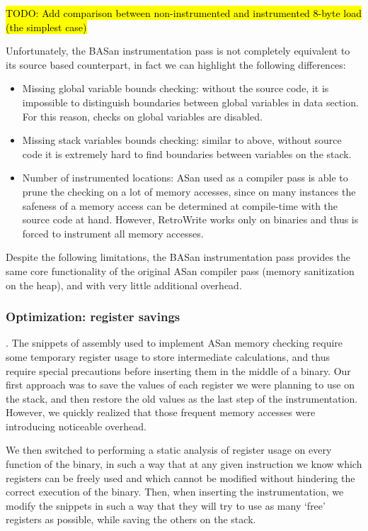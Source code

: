 \documentclass[a4paper,11pt,oneside]{report}
\newcommand{\sysname}{RetroWrite\xspace}
\DeclareRobustCommand{\todo}[1]{{\sethlcolor{cyan}\hl{TODO: #1}}}
\begin{document}
\todo{Add comparison between non-instrumented and instrumented 8-byte load (the 
simplest case)}

Unfortunately, the BASan instrumentation pass is not completely equivalent to 
its source based counterpart, in fact we can highlight the following 
differences:
\begin{itemize}
	\item Missing global variable bounds checking: without the source code, it 
		is impossible to distinguish boundaries between global variables in 
		data section. For this reason, checks on global variables are disabled.
	\item Missing stack variables bounds checking: similar to above, without 
		source code it is extremely hard to find boundaries between variables 
		on the stack.
	\item Number of instrumented locations: ASan used as a compiler pass is 
		able to prune the checking on a lot of memory accesses, since on many 
		instances the safeness of a memory access can be determined at 
		compile-time with the source code at hand. However, \sysname works only 
		on binaries and thus is forced to instrument all memory accesses.
\end{itemize}
Despite the following limitations, the BASan instrumentation pass provides the 
same core functionality of the original ASan compiler pass (memory sanitization 
on the heap), and with very little additional overhead.

\subsubsection{Optimization: register savings}.
The snippets of assembly used to implement ASan memory checking require some 
temporary register usage to store intermediate calculations, and thus require 
special precautions before inserting them in the middle of a binary. Our first 
approach was to save the values of each register we were planning to use on the 
stack, and then restore the old values as the last step of the instrumentation.  
However, we quickly realized that those frequent memory accesses were 
introducing noticeable overhead. 

We then switched to performing a static analysis of register usage on every 
function of the binary, in such a way that at any given instruction we know 
which registers can be freely used and which cannot be modified without 
hindering the correct execution of the binary. Then, when inserting the 
instrumentation, we modify the snippets in such a way that they will try to use 
as many `free' registers as possible, while saving the others on the stack.
\end{document}
